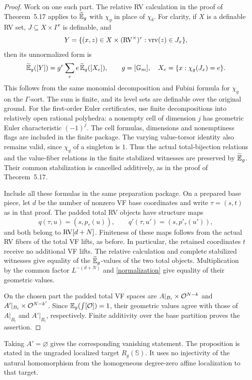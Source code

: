 \begin{proof}
Work on one such part. The relative RV calculation in the proof of
Theorem~5.17 applies to $\widetilde{\mathbb E}_g$ with $\chi_g$ in place of $\chi_b$.
For clarity, if $X$ is a definable RV set,
$J\subseteq X\times\Gamma^r$ is definable, and
\[
 Y=\{(x,z)\in X\times(\mathrm{RV}^\times)^r:\operatorname{vrv}(z)\in J_x\},
\]
then its unnormalized form is
\begin{equation}\label{push}
 \widetilde{\mathbb E}_g([Y])=g^r\sum_e e\,\widetilde{\mathbb E}_g([X_e]),\qquad
 g=[\mathbb G_m],\quad X_e=\{x:\chi_g(J_x)=e\}.
\end{equation}
This follows from the same monomial decomposition and Fubini formula
for $\chi_g$ on the $\Gamma$-sort. The sum is finite, and its level sets are definable over the
original ground. For the first-order Euler certificates, use finite
decompositions into relatively open rational polyhedra: a nonempty
cell of dimension $j$ has geometric Euler characteristic $(-1)^j$.
The cell formulas, dimensions and nonemptiness flags are included in
the finite package. The varying value-torsor identity also remains valid,
since $\chi_g$ of a singleton is $1$. Thus the actual total-bijection
relations and the value-fiber relations in the finite stabilized
witnesses are preserved by $\widetilde{\mathbb E}_g$. Their common stabilization is
cancelled additively, as in the proof of Theorem~5.17.

Include all these formulas in the same preparation package. On a
prepared base piece, let $d$ be the number of nonzero VF base coordinates
and write $\tau=(s,t)$ as in that proof. The padded total RV objects have
structure maps
\[
 q(\tau,u)=(s,p_\tau(u)),\qquad
 q'(\tau,u')=(s,p'_\tau(u')),
\]
and both belong to $\mathrm{RV}[d+N]$. Finiteness of these maps follows from the
actual RV fibers of the total VF lifts, as before. In particular, the
retained coordinates $t$ receive no additional VF lifts. The relative
calculation and complete stabilized witnesses give equality of the
$\widetilde{\mathbb E}_g$-values of the two total objects. Multiplication by the common
factor $L^{-(d+N)}$ and \eqref{normalization} give equality of their
geometric values.

On the chosen part the padded total VF spaces are
$A|_{B_i}\times\mathcal O^{N-k}$ and $A'|_{B_i}\times\mathcal O^{N-k'}$.
Since $\mathbb E_g(\int[\mathcal O])=1$, their geometric values agree with those of
$A|_{B_i}$ and $A'|_{B_i}$, respectively. Finite additivity over the base
partition proves the assertion.
\end{proof}

\begin{remark}
Taking $A'=\varnothing$ gives the corresponding vanishing statement.
The proposition is stated in the ungraded localized target
$R_g(\mathbb S)$. It uses no injectivity of the natural homomorphism
from the homogeneous degree-zero affine localization to that target.
\end{remark}
